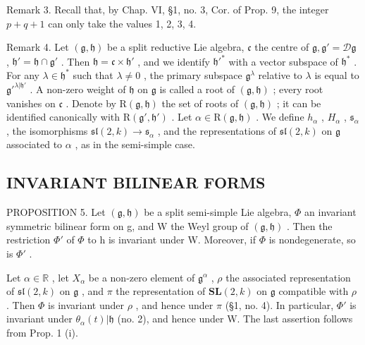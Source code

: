 Remark 3. Recall that, by Chap. VI, §1, no. 3, Cor. of Prop. 9, the integer \(p + q + 1\) can only take the values 1, 2, 3, 4.

Remark 4. Let \((\mathfrak{g},\mathfrak{h})\) be a split reductive Lie algebra, \(\mathfrak{c}\) the centre of \(\mathfrak{g},\mathfrak{g}' = \mathcal{D}\mathfrak{g}\) , \(\mathfrak{h}' = \mathfrak{h} \cap \mathfrak{g}'\) . Then \(\mathfrak{h} = \mathfrak{c} \times \mathfrak{h}'\) , and we identify \(\mathfrak{h}'^*\) with a vector subspace of \(\mathfrak{h}^*\) . For any \(\lambda \in \mathfrak{h}^*\) such that \(\lambda \neq 0\) , the primary subspace \(\mathfrak{g}^\lambda\) relative to \(\lambda\) is equal to \(\mathfrak{g}'^{\lambda | \mathfrak{h}'}\) . A non-zero weight of \(\mathfrak{h}\) on \(\mathfrak{g}\) is called a root of \((\mathfrak{g},\mathfrak{h})\) ; every root vanishes on \(\mathfrak{c}\) . Denote by \(\mathrm{R}(\mathfrak{g},\mathfrak{h})\) the set of roots of \((\mathfrak{g},\mathfrak{h})\) ; it can be identified canonically with \(\mathrm{R}(\mathfrak{g}',\mathfrak{h}')\) . Let \(\alpha \in \mathrm{R}(\mathfrak{g},\mathfrak{h})\) . We define \(h_\alpha\) , \(H_\alpha\) , \(\mathfrak{s}_\alpha\) , the isomorphisms \(\mathfrak{sl}(2,k) \to \mathfrak{s}_\alpha\) , and the representations of \(\mathfrak{sl}(2,k)\) on \(\mathfrak{g}\) associated to \(\alpha\) , as in the semi-simple case.

\subsection{INVARIANT BILINEAR FORMS}

PROPOSITION 5. Let \((\mathfrak{g},\mathfrak{h})\) be a split semi-simple Lie algebra, \(\Phi\) an invariant symmetric bilinear form on g, and W the Weyl group of \((\mathfrak{g},\mathfrak{h})\) . Then the restriction \(\Phi'\) of \(\Phi\) to h is invariant under W. Moreover, if \(\Phi\) is nondegenerate, so is \(\Phi'\) .

Let \(\alpha \in \mathbb{R}\) , let \(X_{\alpha}\) be a non-zero element of \(\mathfrak{g}^{\alpha}\) , \(\rho\) the associated representation of \(\mathfrak{sl}(2,k)\) on \(\mathfrak{g}\) , and \(\pi\) the representation of \(\mathbf{SL}(2,k)\) on \(\mathfrak{g}\) compatible with \(\rho\) . Then \(\varPhi\) is invariant under \(\rho\) , and hence under \(\pi\) (§1, no. 4). In particular, \(\varPhi'\) is invariant under \(\theta_{\alpha}(t)|\mathfrak{h}\) (no. 2), and hence under W. The last assertion follows from Prop. 1 (i).

